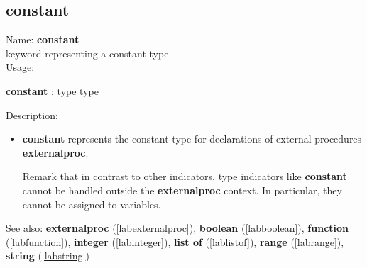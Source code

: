 \subsection{constant}
\label{labconstant}
\noindent Name: \textbf{constant}\\
\phantom{aaa}keyword representing a \textsf{constant} type \\[0.2cm]
\noindent Usage: 
\begin{center}
\textbf{constant} : \textsf{type type}\\
\end{center}
\noindent Description: \begin{itemize}

\item \textbf{constant} represents the \textsf{constant} type for declarations
   of external procedures \textbf{externalproc}.
    
   Remark that in contrast to other indicators, type indicators like
   \textbf{constant} cannot be handled outside the \textbf{externalproc} context.  In
   particular, they cannot be assigned to variables.
\end{itemize}
See also: \textbf{externalproc} (\ref{labexternalproc}), \textbf{boolean} (\ref{labboolean}), \textbf{function} (\ref{labfunction}), \textbf{integer} (\ref{labinteger}), \textbf{list of} (\ref{lablistof}), \textbf{range} (\ref{labrange}), \textbf{string} (\ref{labstring})

